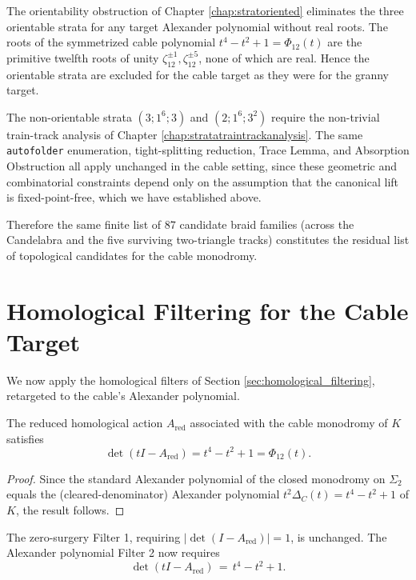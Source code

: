 The orientability obstruction of Chapter \ref{chap:stratoriented} eliminates the three orientable strata for any target Alexander polynomial without real roots. The roots of the symmetrized cable polynomial $t^4 - t^2 + 1 = \Phi_{12}(t)$ are the primitive twelfth roots of unity $\zeta_{12}^{\pm 1}, \zeta_{12}^{\pm 5}$, none of which are real. Hence the orientable strata are excluded for the cable target as they were for the granny target.

The non-orientable strata $(3; 1^6; 3)$ and $(2; 1^6; 3^2)$ require the non-trivial train-track analysis of Chapter \ref{chap:stratatraintrackanalysis}. The same \texttt{autofolder} enumeration, tight-splitting reduction, Trace Lemma, and Absorption Obstruction all apply unchanged in the cable setting, since these geometric and combinatorial constraints depend only on the assumption that the canonical lift is fixed-point-free, which we have established above.

Therefore the same finite list of $87$ candidate braid families (across the Candelabra and the five surviving two-triangle tracks) constitutes the residual list of topological candidates for the cable monodromy.

\section{Homological Filtering for the Cable Target}\label{sec:cable_filtering}

We now apply the homological filters of Section \ref{sec:homological_filtering}, retargeted to the cable's Alexander polynomial.

\begin{lemma}\label{lem:cable_polynomial_target}
The reduced homological action $A_{\text{red}}$ associated with the cable monodromy of $K$ satisfies
\[
\det(tI - A_{\text{red}}) = t^4 - t^2 + 1 = \Phi_{12}(t).
\]
\end{lemma}

\begin{proof}
Since the standard Alexander polynomial of the closed monodromy on $\Sigma_2$ equals the (cleared-denominator) Alexander polynomial $t^2\Delta_C(t) = t^4 - t^2 + 1$ of $K$, the result follows.
\end{proof}

The zero-surgery Filter 1, requiring $|\det(I-A_{\text{red}})| = 1$, is unchanged. The Alexander polynomial Filter 2 now requires
\[
\det(tI-A_{\text{red}}) \,=\, t^4 - t^2 + 1.
\]

